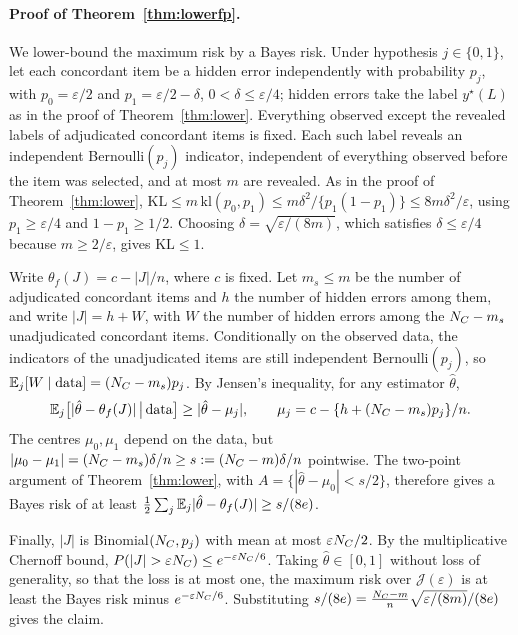 \paragraph{Proof of Theorem~\ref{thm:lowerfp}.} We lower-bound the maximum risk by a Bayes risk. Under hypothesis $j\in\{0,1\}$, let each concordant item be a hidden error independently with probability $p_j$, with $p_0=\varepsilon/2$ and $p_1=\varepsilon/2-\delta$, $0<\delta\le\varepsilon/4$; hidden errors take the label $y^\star(L)$ as in the proof of Theorem~\ref{thm:lower}. Everything observed except the revealed labels of adjudicated concordant items is fixed. Each such label reveals an independent Bernoulli$(p_j)$ indicator, independent of everything observed before the item was selected, and at most $m$ are revealed. As in the proof of Theorem~\ref{thm:lower}, $\mathrm{KL}\le m\,\mathrm{kl}(p_0,p_1)\le m\delta^2/\{p_1(1-p_1)\}\le8m\delta^2/\varepsilon$, using $p_1\ge\varepsilon/4$ and $1-p_1\ge1/2$. Choosing $\delta=\sqrt{\varepsilon/(8m)}$, which satisfies $\delta\le\varepsilon/4$ because $m\ge2/\varepsilon$, gives $\mathrm{KL}\le1$.

Write $\theta_f(J)=c-|J|/n$, where $c$ is fixed. Let $m_s\le m$ be the number of adjudicated concordant items and $h$ the number of hidden errors among them, and write $|J|=h+W$, with $W$ the number of hidden errors among the $N_C-m_s$ unadjudicated concordant items. Conditionally on the observed data, the indicators of the unadjudicated items are still independent Bernoulli$(p_j)$, so $\mathbb{E}_j[W\mid\text{data}]=(N_C-m_s)p_j$. By Jensen's inequality, for any estimator $\hat\theta$,
\[
\mathbb{E}_j\big[|\hat\theta-\theta_f(J)|\,\big|\,\text{data}\big]\ge|\hat\theta-\mu_j|,\qquad\mu_j=c-\{h+(N_C-m_s)p_j\}/n .
\]
The centres $\mu_0,\mu_1$ depend on the data, but $|\mu_0-\mu_1|=(N_C-m_s)\delta/n\ge s:=(N_C-m)\delta/n$ pointwise. The two-point argument of Theorem~\ref{thm:lower}, with $A=\{|\hat\theta-\mu_0|<s/2\}$, therefore gives a Bayes risk of at least $\frac12\sum_j\mathbb{E}_j|\hat\theta-\theta_f(J)|\ge s/(8e)$.

Finally, $|J|$ is Binomial$(N_C,p_j)$ with mean at most $\varepsilon N_C/2$. By the multiplicative Chernoff bound, $P(|J|>\varepsilon N_\Cset)\le e^{-\varepsilon N_\Cset/6}$. Taking $\hat\theta\in[0,1]$ without loss of generality, so that the loss is at most one, the maximum risk over $\mathcal J(\varepsilon)$ is at least the Bayes risk minus $e^{-\varepsilon N_C/6}$. Substituting $s/(8e)=\frac{N_C-m}{n}\sqrt{\varepsilon/(8m)}/(8e)$ gives the claim. \hfill\BlackBox

